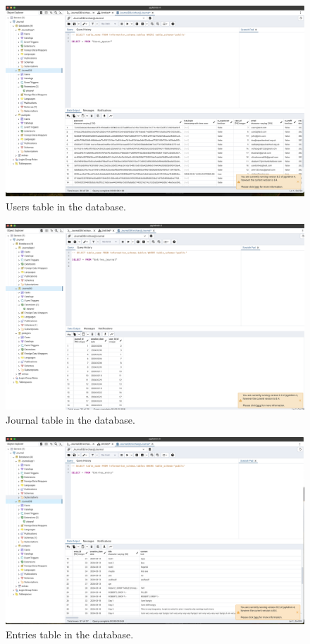 \begin{figure}
    \includegraphics[width=\textwidth]{Assets/pgUsers.png}
    \caption{Users table in the database.}
    \label{fig:pg_users_table}
\end{figure}



\begin{figure}
    \includegraphics[width=\textwidth]{Assets/pgJournal.png}
    \caption{Journal table in the database.}
    \label{fig:pg_journal_table}
\end{figure}

\begin{figure}
    \includegraphics[width=\textwidth]{Assets/pgEntries.png}
    \caption{Entries table in the database.}
    \label{fig:pg_entry_table}
\end{figure}